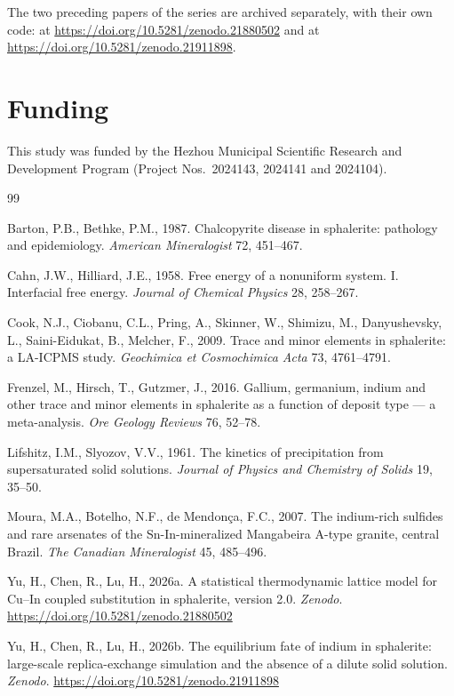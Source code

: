 \documentclass[preprint,12pt,authoryear]{elsarticle}
\begin{document}
The two preceding papers of the series are archived separately, with their own
code: \citet{yu2026} at \url{https://doi.org/10.5281/zenodo.21880502} and
\citet{yu2026b} at \url{https://doi.org/10.5281/zenodo.21911898}.

\section*{Funding}
This study was funded by the Hezhou Municipal Scientific Research and
Development Program (Project Nos.\ 2024143, 2024141 and 2024104).

\begin{thebibliography}{99}
\itemsep2pt

Barton, P.B., Bethke, P.M., 1987. Chalcopyrite disease in sphalerite: pathology
and epidemiology. \textit{American Mineralogist} 72, 451--467.

Cahn, J.W., Hilliard, J.E., 1958. Free energy of a nonuniform system. I.
Interfacial free energy. \textit{Journal of Chemical Physics} 28, 258--267.

Cook, N.J., Ciobanu, C.L., Pring, A., Skinner, W., Shimizu, M., Danyushevsky,
L., Saini-Eidukat, B., Melcher, F., 2009. Trace and minor elements in
sphalerite: a LA-ICPMS study. \textit{Geochimica et Cosmochimica Acta} 73,
4761--4791.

Frenzel, M., Hirsch, T., Gutzmer, J., 2016. Gallium, germanium, indium and
other trace and minor elements in sphalerite as a function of deposit type ---
a meta-analysis. \textit{Ore Geology Reviews} 76, 52--78.

Lifshitz, I.M., Slyozov, V.V., 1961. The kinetics of precipitation from
supersaturated solid solutions. \textit{Journal of Physics and Chemistry of
Solids} 19, 35--50.

Moura, M.A., Botelho, N.F., de Mendon\c{c}a, F.C., 2007. The indium-rich
sulfides and rare arsenates of the Sn-In-mineralized Mangabeira A-type granite,
central Brazil. \textit{The Canadian Mineralogist} 45, 485--496.

Yu, H., Chen, R., Lu, H., 2026a. A statistical thermodynamic lattice model for
Cu--In coupled substitution in sphalerite, version 2.0. \textit{Zenodo}.
\url{https://doi.org/10.5281/zenodo.21880502}

Yu, H., Chen, R., Lu, H., 2026b. The equilibrium fate of indium in sphalerite:
large-scale replica-exchange simulation and the absence of a dilute solid
solution. \textit{Zenodo}. \url{https://doi.org/10.5281/zenodo.21911898}

\end{thebibliography}
\end{document}
